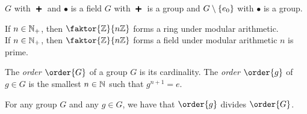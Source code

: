 \begin{lemma}
    $G$ with $\Plus$ and $\bullet$ is a field \ifandonlyif
    $G$ with $\Plus$ is a group and
    $G \setminus \set*{e_0}$ with $\bullet$ is a group.
\end{lemma}

\begin{theorem}
    If $n \in \mathbb{N}_+$, then $\faktor{\Z}{n\Z}$ forms a ring under modular arithmetic.\\
    If $n \in \mathbb{N}_+$, then $\faktor{\Z}{n\Z}$ forms a field under modular arithmetic \ifandonlyif $n$ is prime.
\end{theorem}

\begin{definition}[Order]
    The \emph{order $\order{G}$} of a group $G$ is its cardinality.
    The \emph{order $\order{g}$} of $g \in G$
    is the smallest $n \in \mathbb{N}$ such that $g^{n + 1} = e$.
\end{definition}

\begin{theorem}
    For any group $G$ and any $g \in G$, we have that $\order{g}$ divides $\order{G}$.
\end{theorem}



